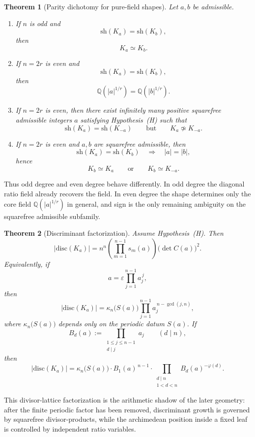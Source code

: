 \documentclass[11pt,letterpaper]{amsart}
\newcommand{\Q}{\mathbb{Q}}
\newcommand{\sh}{\mathrm{sh}}
\newcommand{\disc}{\mathrm{disc}}
\theoremstyle{plain}
\newtheorem{theorem}{Theorem}[section]
\theoremstyle{definition}
\begin{document}
\begin{theorem}[Parity dichotomy for pure-field shapes]
\label{thm:intro-parity}
Let \(a,b\) be admissible.
\begin{enumerate}[label=\textup{(\roman*)},leftmargin=2.8em]
\item
If \(n\) is odd and
\[
\sh(K_a)=\sh(K_b),
\]
then
\[
K_a\simeq K_b.
\]

\item
If \(n=2r\) is even and
\[
\sh(K_a)=\sh(K_b),
\]
then
\[
\Q(|a|^{1/r})=\Q(|b|^{1/r}).
\]

\item
If \(n=2r\) is even, then there exist infinitely many positive squarefree
admissible integers \(a\) satisfying Hypothesis~\textup{(H)} such that
\[
\sh(K_a)=\sh(K_{-a})
\qquad\text{but}\qquad
K_a\not\simeq K_{-a}.
\]

\item
If \(n=2r\) is even and \(a,b\) are squarefree admissible, then
\[
\sh(K_a)=\sh(K_b)
\quad\Longrightarrow\quad
|a|=|b|,
\]
hence
\[
K_b\simeq K_a
\qquad\text{or}\qquad
K_b\simeq K_{-a}.
\]
\end{enumerate}
\end{theorem}

Thus odd degree and even degree behave differently.  In odd degree the diagonal
ratio field already recovers the field.  In even degree the shape determines
only the core field \(\Q(|a|^{1/r})\) in general, and sign is the only
remaining ambiguity on the squarefree admissible subfamily.

\begin{theorem}[Discriminant factorization]
\label{thm:intro-discriminant}
Assume Hypothesis~\textup{(H)}.  Then
\[
|\disc(K_a)|
=
n^n\left(\prod_{m=1}^{n-1}s_m(a)\right)\bigl(\det C(a)\bigr)^2.
\]
Equivalently, if
\[
a=\varepsilon\prod_{j=1}^{n-1} a_j^{\,j},
\]
then
\[
|\disc(K_a)|
=
\kappa_n\bigl(S(a)\bigr)\prod_{j=1}^{n-1} a_j^{\,n-\gcd(j,n)},
\]
where \(\kappa_n\bigl(S(a)\bigr)\) depends only on the periodic datum \(S(a)\).
If
\[
B_d(a):=
\prod_{\substack{1\le j\le n-1\\ d\mid j}} a_j
\qquad (d\mid n),
\]
then
\[
|\disc(K_a)|
=
\kappa_n\bigl(S(a)\bigr)\cdot B_1(a)^{\,n-1}
\cdot \prod_{\substack{d\mid n\\ 1<d<n}} B_d(a)^{-\varphi(d)}.
\]
\end{theorem}

This divisor-lattice factorization is the arithmetic shadow of the later
geometry: after the finite periodic factor has been removed, discriminant growth
is governed by squarefree divisor-products, while the archimedean position
inside a fixed leaf is controlled by independent ratio variables.
\end{document}
